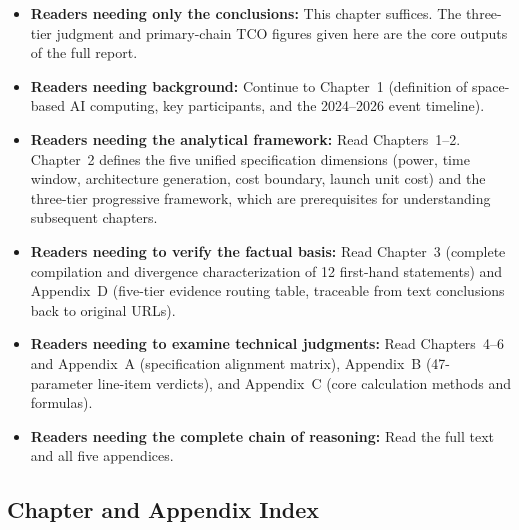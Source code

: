 \begin{itemize}[leftmargin=*]
    \item \textbf{Readers needing only the conclusions:} This chapter suffices. The three-tier judgment and primary-chain TCO figures given here are the core outputs of the full report.
    \item \textbf{Readers needing background:} Continue to Chapter~1 (definition of space-based AI computing, key participants, and the 2024--2026 event timeline).
    \item \textbf{Readers needing the analytical framework:} Read Chapters~1--2. Chapter~2 defines the five unified specification dimensions (power, time window, architecture generation, cost boundary, launch unit cost) and the three-tier progressive framework, which are prerequisites for understanding subsequent chapters.
    \item \textbf{Readers needing to verify the factual basis:} Read Chapter~3 (complete compilation and divergence characterization of 12 first-hand statements) and Appendix~D (five-tier evidence routing table, traceable from text conclusions back to original URLs).
    \item \textbf{Readers needing to examine technical judgments:} Read Chapters~4--6 and Appendix~A (specification alignment matrix), Appendix~B (47-parameter line-item verdicts), and Appendix~C (core calculation methods and formulas).
    \item \textbf{Readers needing the complete chain of reasoning:} Read the full text and all five appendices.
\end{itemize}

\subsection*{Chapter and Appendix Index}

